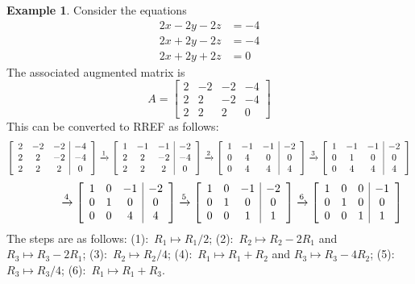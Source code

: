 \documentclass[a4paper]{book}
\theoremstyle{definition}
\newtheorem{example}[theorem]{Example}
\begin{document}
\begin{example}
 Consider the equations
 \begin{align*}
  2x-2y-2z &= -4 \\
  2x+2y-2z &= -4 \\
  2x+2y+2z &= 0
 \end{align*}
 The associated augmented matrix is 
 \[ A = \left[\begin{array}{ccc|c}
         2&-2&-2&-4 \\
         2& 2&-2&-4 \\ 
         2& 2& 2& 0
        \end{array}\right]          
 \]
 This can be converted to RREF as follows:
 {\small \[
  \left[\begin{array}{ccc|c}   
   2&-2&-2&-4 \\       
   2& 2&-2&-4 \\       
   2& 2& 2& 0
  \end{array}\right] \xrightarrow{1}
  \left[\begin{array}{ccc|c}   
   1&-1&-1&-2 \\       
   2& 2&-2&-4 \\       
   2& 2& 2& 0
  \end{array}\right] \xrightarrow{2}
  \left[\begin{array}{ccc|c}   
   1&-1&-1&-2 \\       
   0& 4& 0& 0 \\       
   0& 4& 4& 4
  \end{array}\right] \xrightarrow{3}
  \left[\begin{array}{ccc|c}   
   1&-1&-1&-2 \\       
   0& 1& 0& 0 \\       
   0& 4& 4& 4
  \end{array}\right] 
 \]
 \[
  \hspace{4em}\xrightarrow{4}
  \left[\begin{array}{ccc|c}   
   1& 0&-1&-2 \\       
   0& 1& 0& 0 \\       
   0& 0& 4& 4
  \end{array}\right] \xrightarrow{5}
  \left[\begin{array}{ccc|c}   
   1& 0&-1&-2 \\       
   0& 1& 0& 0 \\       
   0& 0& 1& 1
  \end{array}\right] \xrightarrow{6}
  \left[\begin{array}{ccc|c}   
   1& 0& 0&-1 \\       
   0& 1& 0& 0 \\       
   0& 0& 1& 1
  \end{array}\right]
 \]}
 The steps are as follows: (1):~$R_1\mapsto R_1/2$;
 (2):~$R_2\mapsto R_2-2R_1$ and $R_3\mapsto R_3-2R_1$; 
 (3):~$R_2\mapsto R_2/4$; (4):~$R_1\mapsto R_1+R_2$ and
 $R_3\mapsto R_3-4R_2$; (5):~$R_3\mapsto R_3/4$; 
 (6):~$R_1\mapsto R_1+R_3$.


\end{example}
\end{document}
